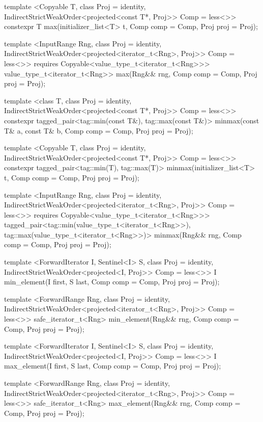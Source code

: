 {\begin{codeblock}
{{    template <Copyable T, class Proj = identity,
        IndirectStrictWeakOrder<projected<const T*, Proj>> Comp = less<>>
      constexpr T max(initializer_list<T> t, Comp comp = Comp{}, Proj proj = Proj{});

    template <InputRange Rng, class Proj = identity,
        IndirectStrictWeakOrder<projected<iterator_t<Rng>, Proj>> Comp = less<>>
      requires Copyable<value_type_t<iterator_t<Rng>>>
      value_type_t<iterator_t<Rng>>
        max(Rng&& rng, Comp comp = Comp{}, Proj proj = Proj{});

    template <class T, class Proj = identity,
        IndirectStrictWeakOrder<projected<const T*, Proj>> Comp = less<>>
      constexpr tagged_pair<tag::min(const T&), tag::max(const T&)>
        minmax(const T& a, const T& b, Comp comp = Comp{}, Proj proj = Proj{});

    template <Copyable T, class Proj = identity,
        IndirectStrictWeakOrder<projected<const T*, Proj>> Comp = less<>>
      constexpr tagged_pair<tag::min(T), tag::max(T)>
        minmax(initializer_list<T> t, Comp comp = Comp{}, Proj proj = Proj{});

    template <InputRange Rng, class Proj = identity,
        IndirectStrictWeakOrder<projected<iterator_t<Rng>, Proj>> Comp = less<>>
      requires Copyable<value_type_t<iterator_t<Rng>>>
      tagged_pair<tag::min(value_type_t<iterator_t<Rng>>),
                  tag::max(value_type_t<iterator_t<Rng>>)>
        minmax(Rng&& rng, Comp comp = Comp{}, Proj proj = Proj{});

    template <ForwardIterator I, Sentinel<I> S, class Proj = identity,
        IndirectStrictWeakOrder<projected<I, Proj>> Comp = less<>>
      I min_element(I first, S last, Comp comp = Comp{}, Proj proj = Proj{});

    template <ForwardRange Rng, class Proj = identity,
        IndirectStrictWeakOrder<projected<iterator_t<Rng>, Proj>> Comp = less<>>
      safe_iterator_t<Rng>
        min_element(Rng&& rng, Comp comp = Comp{}, Proj proj = Proj{});

    template <ForwardIterator I, Sentinel<I> S, class Proj = identity,
        IndirectStrictWeakOrder<projected<I, Proj>> Comp = less<>>
      I max_element(I first, S last, Comp comp = Comp{}, Proj proj = Proj{});

    template <ForwardRange Rng, class Proj = identity,
        IndirectStrictWeakOrder<projected<iterator_t<Rng>, Proj>> Comp = less<>>
      safe_iterator_t<Rng>
        max_element(Rng&& rng, Comp comp = Comp{}, Proj proj = Proj{});

}}
\end{codeblock}}
